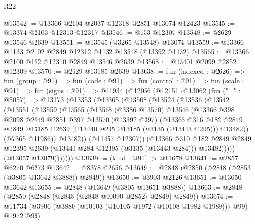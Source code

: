 \begin{lexlean}{R22}
\begin{coremodule}
@13542 := @13366 @2104 @2037 @12318 @2851 @13074 @12423
@13545 := @13374 @2103 @12313 @12317
@13546 := @153 @12307
@13548 := @2629 @13546 @2639
@13551 := @13545 (@3265 @13548) @13074
@13559 := @13366 @1133 @2102 @2849 @12312 @1132 @13548 (@13392 @1132)
@13565 := @13366 @2100 @182 @12310 @2849 @13546 @2639
@13568 := @13401 @2099 @2852 @12309
@13570 := @2629 @13185 @2639
@13638 := fun (indexed : @2626) =>
  fun (group : @91) =>
  fun (code : @91) =>
  fun (control : @91) =>
  fun (scale : @91) =>
  fun (signs : @91) =>
  @11934
    (@12056
      (@12151
        (@13062
          (fun ("_" : @5057) =>
          @13173
            (@13353
              (@13365
                (@13508
                  (@13524
                    (@13536
                      (@13542
                        (@13551
                          (@13559
                            (@13565
                              (@13568
                                (@3386 @13570)
                                @13546
                                (@13366
                                  @398
                                  @2098
                                  @2849
                                  @2851
                                  @397
                                  @13570
                                  (@13392 @397)
                                  (@13366
                                    @316
                                    @182
                                    @2849
                                    @2849
                                    @13185
                                    @2639
                                    (@13440 @295 @13185 (@3135 (@13443 @295)))
                                    @13482))
                                (@7365 @11986))
                              @13482))
                          (@11457 @12307))
                        (@13366
                          @310
                          @182
                          @2849
                          @2849
                          @12395
                          @2639
                          (@13440 @284 @12395 (@3135 (@13443 @284)))
                          @13482)))))
                (@13057 @13079)))))))
@13639 := (kind : @91) -> @11678
@13641 := @2857 @6270 @6273
@13642 := @8378 @2656
@13649 := @2848 (@2850 (@2848 (@2853 (@3805 @13642 @3888)) @2849))
@13650 := @3903 @2126
@13651 := @13650 @13642
@13655 := @2848 (@13649 (@3805 @13651 @3888))
@13663 := @2848 (@2850 (@2848 (@2848 (@2848 @10090 @2852) @2849) @2849))
@13674 := @11734 (@3906 (@3880 (@10103 (@10105 @1972 (@10108 @1982 @1989))) @99) @1972 @99)

\end{coremodule}
\end{lexlean}
